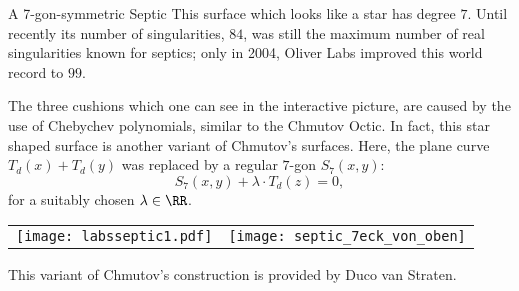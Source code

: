 \begin{surferPage}[7-gon]{A 7-gon-symmetric Septic}
    This surface which looks like a star has degree $7$.  
    Until recently its number of singularities, $84$, was still the
    maximum number of real singularities known for septics;
    only in 2004, Oliver Labs improved this world record to $99$.
  
  
 The three cushions which one can see in the interactive picture, 
    are caused by the use of Chebychev polynomials, similar to the Chmutov
    Octic. 
    In fact, this star shaped surface is another variant of Chmutov's surfaces.
    Here, the plane curve $T_d(x)+T_d(y)$ was replaced by a regular $7$-gon
    $S_7(x,y)$: 
   \[S_7(x,y) + \lambda \cdot T_d(z) = 0,\]
    for a suitably chosen $\lambda\in\RR$. 
    \vspace*{-0.3em}
    \begin{center}
      \begin{tabular}{c@{\qquad}c}
        \texttt{[image: labsseptic1.pdf]}
        &
        \texttt{[image: septic\_7eck\_von\_oben]}
      \end{tabular}
    \end{center}
    \vspace*{-0.3em}   
   This variant of Chmutov's construction is provided by Duco van Straten.
\end{surferPage}
